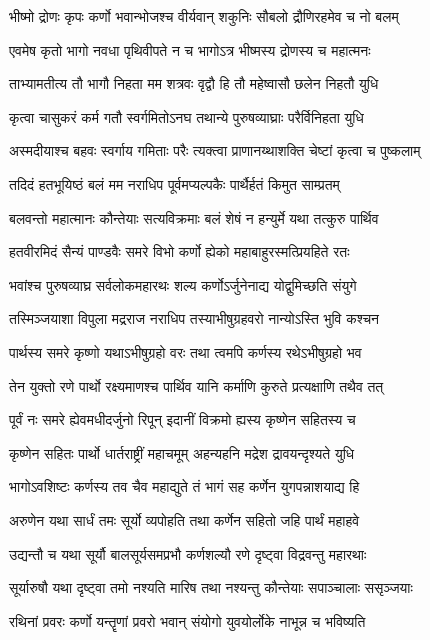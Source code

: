\twolineshloka
{भीष्मो द्रोणः कृपः कर्णो भवान्भोजश्च वीर्यवान्}
{शकुनिः सौबलो द्रौणिरहमेव च नो बलम्}


\twolineshloka
{एवमेष कृतो भागो नवधा पृथिवीपते}
{न च भागोऽत्र भीष्मस्य द्रोणस्य च महात्मनः}


\twolineshloka
{ताभ्यामतीत्य तौ भागौ निहता मम शत्रवः}
{वृद्वौ हि तौ महेष्वासौ छलेन निहतौ युधि}


\twolineshloka
{कृत्वा चासुकरं कर्म गतौ स्वर्गमितोऽनघ}
{तथान्ये पुरुषव्याघ्राः परैर्विनिहता युधि}


\threelineshloka
{अस्मदीयाश्च बहवः स्वर्गाय गमिताः परैः}
{त्यक्त्वा प्राणानय्थाशक्ति चेष्टां कृत्वा च पुष्कलाम्}
{}


\twolineshloka
{तदिदं हतभूयिष्ठं बलं मम नराधिप}
{पूर्वमप्यल्पकैः पार्थैर्हतं किमुत साम्प्रतम्}


\twolineshloka
{बलवन्तो महात्मानः कौन्तेयाः सत्यविक्रमाः}
{बलं शेषं न हन्युर्मे यथा तत्कुरु पार्थिव}


\twolineshloka
{हतवीरमिदं सैन्यं पाण्डवैः समरे विभो}
{कर्णो ह्येको महाबाहुरस्मत्प्रियहिते रतः}


\twolineshloka
{भवांश्च पुरुषव्याघ्र सर्वलोकमहारथः}
{शल्य कर्णोऽर्जुनेनाद्य योद्वुमिच्छति संयुगे}


\twolineshloka
{तस्मिञ्जयाशा विपुला मद्रराज नराधिप}
{तस्याभीषुग्रहवरो नान्योऽस्ति भुवि कश्चन}


\twolineshloka
{पार्थस्य समरे कृष्णो यथाऽभीषुग्रहो वरः}
{तथा त्वमपि कर्णस्य रथेऽभीषुग्रहो भव}


\twolineshloka
{तेन युक्तो रणे पार्थो रक्ष्यमाणश्च पार्थिव}
{यानि कर्माणि कुरुते प्रत्यक्षाणि तथैव तत्}


\twolineshloka
{पूर्वं नः समरे ह्येवमधीदर्जुनो रिपून्}
{इदानीं विक्रमो ह्यस्य कृष्णेन सहितस्य च}


\twolineshloka
{कृष्णेन सहितः पार्थो धार्तराष्ट्रीं महाचमूम्}
{अहन्यहनि मद्रेश द्रावयन्दृश्यते युधि}


\twolineshloka
{भागोऽवशिष्टः कर्णस्य तव चैव महाद्युते}
{तं भागं सह कर्णेन युगपन्नाशयाद्य हि}


\twolineshloka
{अरुणेन यथा सार्धं तमः सूर्यो व्यपोहति}
{तथा कर्णेन सहितो जहि पार्थं महाहवे}


\twolineshloka
{उद्यन्तौ च यथा सूर्यौ बालसूर्यसमप्रभौ}
{कर्णशल्यौ रणे दृष्ट्वा विद्रवन्तु महारथाः}


\twolineshloka
{सूर्यारुषौ यथा दृष्ट्वा तमो नश्यति मारिष}
{तथा नश्यन्तु कौन्तेयाः सपाञ्चालाः ससृञ्जयाः}


\twolineshloka
{रथिनां प्रवरः कर्णो यन्तॄणां प्रवरो भवान्}
{संयोगो युवयोर्लोके नाभून्न च भविष्यति}



